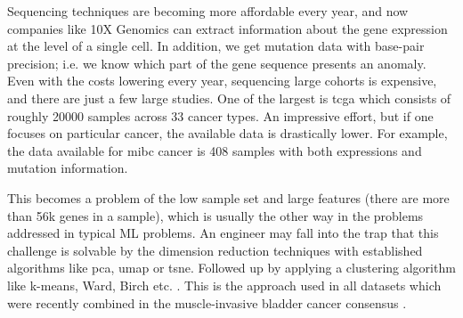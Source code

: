 
Sequencing techniques are becoming more affordable every year, and now companies like 10X Genomics can extract information about the gene expression at the level of a single cell. In addition, we get mutation data with base-pair precision; i.e. we know which part of the gene sequence presents an anomaly. Even with the costs lowering every year, sequencing large cohorts is expensive, and there are just a few large studies. One of the largest is \acrshort{tcga}\cite{Tcga2018-sj} which consists of roughly 20000 samples across 33 cancer types. An impressive effort, but if one focuses on particular cancer, the available data is drastically lower. For example, the data available for \acrfull{mibc} cancer is 408 samples with both expressions and mutation information\cite{Robertson2017-mg}.  

This becomes a problem of the low sample set and large features (there are more than 56k genes in a sample), which is usually the other way in the problems addressed in typical ML problems. An engineer may fall into the trap that this challenge is solvable by the dimension reduction techniques with established algorithms like \acrfull{pca}, \acrfull{umap} or \acrfull{tsne}. Followed up by applying a clustering algorithm like k-means, Ward, Birch etc. . This is the approach used in all datasets which were recently combined in the muscle-invasive bladder cancer consensus \citet{Kamoun2020-tj}.

